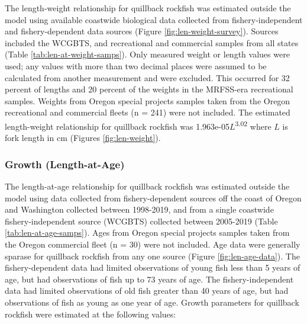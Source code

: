 \documentclass[11pt,
  english,
  a4paper,
]{article}
\begin{document}
The length-weight relationship for quillback rockfish was estimated outside the model using available coastwide biological data collected from fishery-independent and fishery-dependent data sources (Figure \ref{fig:len-weight-survey}). Sources included the WCGBTS, and recreational and commercial samples from all states (Table \ref{tab:len-at-weight-samps}). Only measured weight or length values were used; any values with more than two decimal places were assumed to be calculated from another measurement and were excluded. This occurred for 32 percent of lengths and 20 percent of the weights in the MRFSS-era recreational samples. Weights from Oregon special projects samples taken from the Oregon recreational and commercial fleets (n = 241) were not included. The estimated length-weight relationship for quillback rockfish was 1.963e-05{\(L\)\leavevmode\tagmcend\tagstructend}\textsuperscript{3.02} where {\(L\)\leavevmode\tagmcend\tagstructend} is fork length in cm (Figures \ref{fig:len-weight}).

\leavevmode\tagmcend\tagstructend\par


\hypertarget{growth-length-at-age}{%
\subsubsection{Growth (Length-at-Age)}\label{growth-length-at-age}}

\leavevmode\tagmcend\tagstructend


The length-at-age relationship for quillback rockfish was estimated outside the model using data collected from fishery-dependent sources off the coast of Oregon and Washington collected between 1998-2019, and from a single coastwide fishery-independent source (WCGBTS) collected between 2005-2019 (Table \ref{tab:len-at-age-samps}). Ages from Oregon special projects samples taken from the Oregon commercial fleet (n = 30) were not included. Age data were generally sparase for quillback rockfish from any one source (Figure \ref{fig:len-age-data}). The fishery-dependent data had limited observations of young fish less than 5 years of age, but had observations of fish up to 73 years of age. The fishery-independent data had limited observations of old fish greater than 40 years of age, but had observations of fish as young as one year of age. Growth parameters for quillback rockfish were estimated at the following values:
\end{document}
